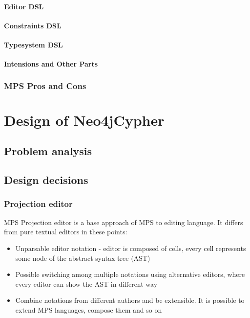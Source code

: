 		\subsubsection{Editor DSL}
		\subsubsection{Constraints DSL}
		\subsubsection{Typesystem DSL}
		\subsubsection{Intensions and Other Parts}

	\subsection{MPS Pros and Cons}


\chapter{Design of Neo4jCypher}

\section{Problem analysis}

\section{Design decisions}

\subsection{Projection editor}

MPS Projection editor is a base approach of MPS to editing language. It differs from pure textual
editors in these points:

\begin{itemize}
  \item Unparsable editor notation - editor is composed of cells, every cell represents some node of
  the abstract syntax tree (AST)
  \item Possible switching among multiple notations using alternative editors, where every editor
  can show the AST in different way
  \item Combine notations from different authors and be extensible. It is possible to extend MPS
  languages, compose them and so on
\end{itemize}

